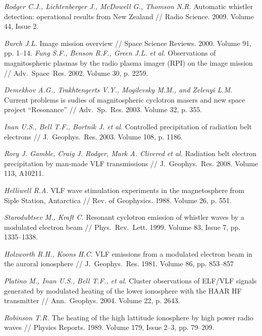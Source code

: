 \documentclass[autoref,10pt]{disser}
\begin{document}
\begin{thebibliography}{99}

\textit{Rodger C.J.,  Lichtenberger J., McDowell G., Thomson N.R.} Automatic whistler detection: operational results from New Zealand // Radio Science. 2009. Volume 44, Issue 2. %

\textit{Burch J.L.} Image mission overview // Space Science Reviews. 2000.  Volume 91, pp. 1--14. %
\textit{Fung S.F., Benson R.F., Green J.L. et al.} Observations of magnitospheric plasmas by the radio plasma imager (RPI) on the image mission // Adv.~Space~Res. 2002. Volume 30, p. 2259. %

\textit{Demekhov A.G., Trakhtengerts V.Y., Mogilevsky M.M., and Zelenyi L.M.} Current problems is sudies of magnitospheric cyclotron masers and new space project ``Resonance'' // Adv.~Sp.~Res. 2003. Volume 32, p. 355. %

\textit{Inan U.S., Bell T.F., Bortnik J. et al.} Controlled precipitation of radiation belt electrons // J.~Geophys.~Res. 2003. Volume 108, p. 1186.%

\textit{Rory J. Gamble, Craig J. Rodger, Mark A. Clivered et al.} Radiation belt electron precipitation by man-made VLF transmissions // J.~Geophys.~Res. 2008. Volume 113, A10211. %

\textit{Helliwell R.A.} VLF wave stimulation experiments in the magnetosphere from Siple Station, Antarctica // Rev. of Geophysics. 1988. Volume 26, p. 551. %

\textit{Starodubtsev M., Kraft C.} Resonant cyclotron emission of whistler waves by a modulated electron beam // Phys.~Rev.~Lett. 1999. Volume 83, Issue 7, pp. 1335--1338. 

\textit{Holzworth R.H., Koons H.C.} VLF emissions from a modulated electron beam in the auroral ionosphere // J.~Geophys.~Res. 1981. Volume 86, pp. 853--857 

\textit{Platino M., Inan U.S., Bell T.F., et al.} Cluster observations of ELF/VLF signals generated by modulated heating of the lower ionosphere with the HAAR HF transmitter // Ann.~Geophys. 2004. Volume 22, p. 2643. %

\textit{Robinson T.R.} The heating of the high lattitude ionosphere by high power radio waves // Physics Reports. 1989. Volume 179, Issue 2--3, pp. 79--209. %


\end{thebibliography}
\end{document}
